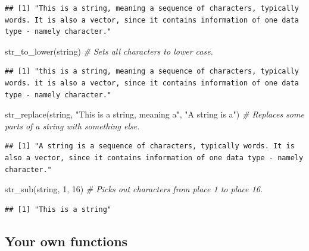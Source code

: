 \documentclass[
]{article}
\newenvironment{Shaded}{\begin{snugshade}}{\end{snugshade}}
\newcommand{\CommentTok}[1]{\textcolor[rgb]{0.56,0.35,0.01}{\textit{#1}}}
\newcommand{\DecValTok}[1]{\textcolor[rgb]{0.00,0.00,0.81}{#1}}
\newcommand{\FunctionTok}[1]{\textcolor[rgb]{0.00,0.00,0.00}{#1}}
\newcommand{\NormalTok}[1]{#1}
\newcommand{\StringTok}[1]{\textcolor[rgb]{0.31,0.60,0.02}{#1}}
\begin{document}
\begin{verbatim}
## [1] "This is a string, meaning a sequence of characters, typically words. It is also a vector, since it contains information of one data type - namely character."
\end{verbatim}

\begin{Shaded}
\begin{Highlighting}[]
\FunctionTok{str\_to\_lower}\NormalTok{(string)  }\CommentTok{\# Sets all characters to lower case.}
\end{Highlighting}
\end{Shaded}

\begin{verbatim}
## [1] "this is a string, meaning a sequence of characters, typically words. it is also a vector, since it contains information of one data type - namely character."
\end{verbatim}

\begin{Shaded}
\begin{Highlighting}[]
\FunctionTok{str\_replace}\NormalTok{(string, }\StringTok{"This is a string, meaning a"}\NormalTok{, }\StringTok{"A string is a"}\NormalTok{)  }\CommentTok{\# Replaces some parts of a string with something else.}
\end{Highlighting}
\end{Shaded}

\begin{verbatim}
## [1] "A string is a sequence of characters, typically words. It is also a vector, since it contains information of one data type - namely character."
\end{verbatim}

\begin{Shaded}
\begin{Highlighting}[]
\FunctionTok{str\_sub}\NormalTok{(string, }\DecValTok{1}\NormalTok{, }\DecValTok{16}\NormalTok{)  }\CommentTok{\# Picks out characters from place 1 to place 16.}
\end{Highlighting}
\end{Shaded}

\begin{verbatim}
## [1] "This is a string"
\end{verbatim}

\hypertarget{your-own-functions}{%
\subsection{Your own functions}\label{your-own-functions}}
\end{document}
